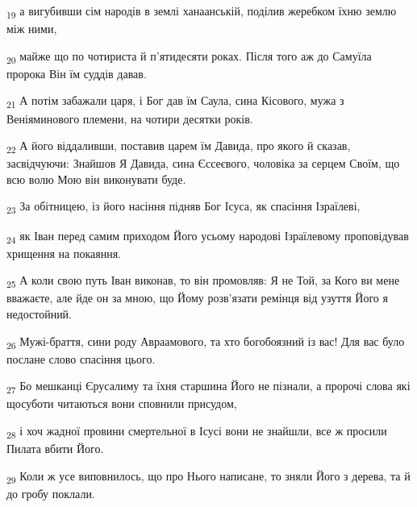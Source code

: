 \begin{tcolorbox}
\textsubscript{19} а вигубивши сім народів в землі ханаанській, поділив жеребком їхню землю між ними,
\end{tcolorbox}
\begin{tcolorbox}
\textsubscript{20} майже що по чотириста й п'ятидесяти роках. Після того аж до Самуїла пророка Він їм суддів давав.
\end{tcolorbox}
\begin{tcolorbox}
\textsubscript{21} А потім забажали царя, і Бог дав їм Саула, сина Кісового, мужа з Веніяминового племени, на чотири десятки років.
\end{tcolorbox}
\begin{tcolorbox}
\textsubscript{22} А його віддаливши, поставив царем їм Давида, про якого й сказав, засвідчуючи: Знайшов Я Давида, сина Єссеєвого, чоловіка за серцем Своїм, що всю волю Мою він виконувати буде.
\end{tcolorbox}
\begin{tcolorbox}
\textsubscript{23} За обітницею, із його насіння підняв Бог Ісуса, як спасіння Ізраїлеві,
\end{tcolorbox}
\begin{tcolorbox}
\textsubscript{24} як Іван перед самим приходом Його усьому народові Ізраїлевому проповідував хрищення на покаяння.
\end{tcolorbox}
\begin{tcolorbox}
\textsubscript{25} А коли свою путь Іван виконав, то він промовляв: Я не Той, за Кого ви мене вважаєте, але йде он за мною, що Йому розв'язати ремінця від узуття Його я недостойний.
\end{tcolorbox}
\begin{tcolorbox}
\textsubscript{26} Мужі-браття, сини роду Авраамового, та хто богобоязний із вас! Для вас було послане слово спасіння цього.
\end{tcolorbox}
\begin{tcolorbox}
\textsubscript{27} Бо мешканці Єрусалиму та їхня старшина Його не пізнали, а пророчі слова які щосуботи читаються вони сповнили присудом,
\end{tcolorbox}
\begin{tcolorbox}
\textsubscript{28} і хоч жадної провини смертельної в Ісусі вони не знайшли, все ж просили Пилата вбити Його.
\end{tcolorbox}
\begin{tcolorbox}
\textsubscript{29} Коли ж усе виповнилось, що про Нього написане, то зняли Його з дерева, та й до гробу поклали.
\end{tcolorbox}
